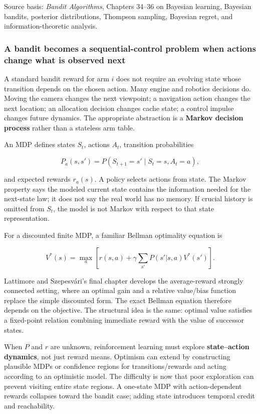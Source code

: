 Source basis: \emph{Bandit Algorithms}, Chapters 34--36 on Bayesian learning, Bayesian bandits, posterior distributions, Thompson sampling, Bayesian regret, and information-theoretic analysis.

\subsubsection{A bandit becomes a sequential-control problem when actions change what is observed next}\label{a-bandit-becomes-a-sequential-control-problem-when-actions-change-what-is-observed-next}

A standard bandit reward for arm \(i\) does not require an evolving state whose transition depends on the chosen action. Many engine and robotics decisions do. Moving the camera changes the next viewpoint; a navigation action changes the next location; an allocation decision changes cache state; a control impulse changes future dynamics. The appropriate abstraction is a \textbf{Markov decision process} rather than a stateless arm table.

An MDP defines states \(S_t\), actions \(A_t\), transition probabilities

\[
P_a(s,s')
=
P(S_{t+1}=s'\mid S_t=s,A_t=a),
\]

and expected rewards \(r_a(s)\). A policy selects actions from state. The Markov property says the modeled current state contains the information needed for the next-state law; it does not say the real world has no memory. If crucial history is omitted from \(S_t\), the model is not Markov with respect to that state representation.

For a discounted finite MDP, a familiar Bellman optimality equation is

\[
V^*(s)
=
\max_a
\left[
r(s,a)
+
\gamma
\sum_{s'}
P(s'|s,a)V^*(s')
\right].
\]

Lattimore and Szepesvári's final chapter develops the average-reward strongly connected setting, where an optimal gain and a relative value/bias function replace the simple discounted form. The exact Bellman equation therefore depends on the objective. The structural idea is the same: optimal value satisfies a fixed-point relation combining immediate reward with the value of successor states.

When \(P\) and \(r\) are unknown, reinforcement learning must explore \textbf{state--action dynamics}, not just reward means. Optimism can extend by constructing plausible MDPs or confidence regions for transitions/rewards and acting according to an optimistic model. The difficulty is now that poor exploration can prevent visiting entire state regions. A one-state MDP with action-dependent rewards collapses toward the bandit case; adding state introduces temporal credit and reachability.

